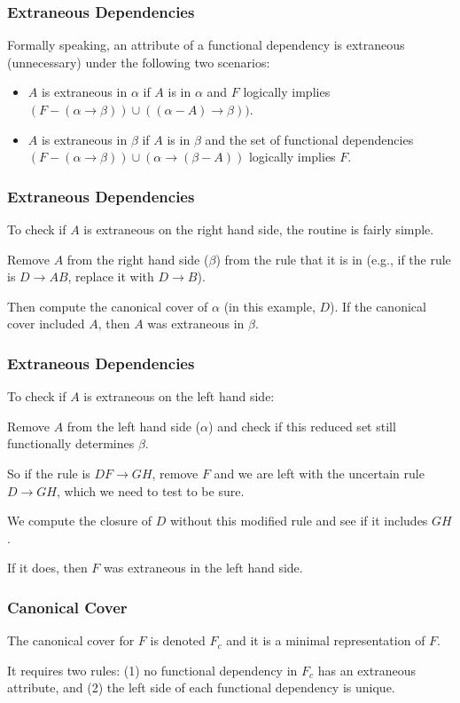 \begin{frame}
\frametitle{Extraneous Dependencies}

Formally speaking, an attribute of a functional dependency is \alert{extraneous} (unnecessary) under the following two scenarios:
\begin{itemize}
	\item $A$ is extraneous in $\alpha$ if $A$ is in $\alpha$ and $F$ logically implies $(F - (\alpha \rightarrow \beta)) \cup ((\alpha - A) \rightarrow \beta))$.
	\item $A$ is extraneous in $\beta$ if $A$ is in $\beta$ and the set of functional dependencies $(F - (\alpha \rightarrow \beta)) \cup (\alpha \rightarrow (\beta - A))$ logically implies $F$.
\end{itemize}

\end{frame}



\begin{frame}
\frametitle{Extraneous Dependencies}
To check if $A$ is extraneous on the right hand side, the routine is fairly simple.

Remove $A$ from the right hand side ($\beta$) from the rule that it is in (e.g., if the rule is $D \rightarrow AB$, replace it with $D \rightarrow B$).

Then compute the canonical cover of $\alpha$ (in this example, $D$). If the canonical cover included $A$, then $A$ was extraneous in $\beta$.

\end{frame}



\begin{frame}
\frametitle{Extraneous Dependencies}

To check if $A$ is extraneous on the left hand side: 

Remove $A$ from the left hand side ($\alpha$) and check if this reduced set still functionally determines $\beta$. 

So if the rule is $DF \rightarrow GH$, remove $F$ and we are left with the uncertain rule $D \rightarrow GH$, which we need to test to be sure. 

We compute the closure of $D$ without this modified rule and see if it includes $GH$. 

If it does, then $F$ was extraneous in the left hand side.

\end{frame}


\begin{frame}
\frametitle{Canonical Cover}

The canonical cover for $F$ is denoted $F_{c}$ and it is a minimal representation of $F$. 

It requires two rules: (1) no functional dependency in $F_{c}$ has an extraneous attribute, and (2) the left side of each functional dependency is unique. 


\end{frame}



